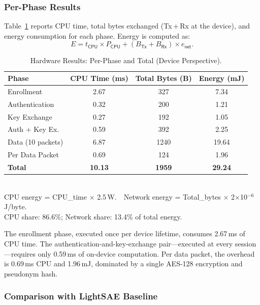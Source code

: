 \documentclass[conference]{IEEEtran}
\begin{document}
\subsubsection{Per-Phase Results}

Table~\ref{tab:hwresults} reports CPU time, total bytes exchanged
(Tx\,+\,Rx at the device), and energy consumption for each phase.
Energy is computed as:
\begin{equation}
  E = t_\mathsf{CPU} \times P_\mathsf{CPU}
      + (B_\mathsf{Tx}+B_\mathsf{Rx}) \times e_\mathsf{net}.
\end{equation}

\begin{table}[!t]
  \centering
  \caption{Hardware Results: Per-Phase and Total (Device Perspective).}
  \label{tab:hwresults}
  \scriptsize
  \setlength{\tabcolsep}{4pt}
  \begin{tabular}{lccc}
    \toprule
    Phase & CPU Time (ms) & Total Bytes (B) & Energy (mJ) \\
    \midrule
    Enrollment         & 2.67 & 327 & 7.34 \\
    Authentication     & 0.32 & 200 & 1.21 \\
    Key Exchange       & 0.27 & 192 & 1.05 \\
    Auth + Key Ex.     & 0.59 & 392 & 2.25 \\
    Data (10 packets)  & 6.87 & 1240 & 19.64 \\
    Per Data Packet    & 0.69 & 124  & 1.96 \\
    \midrule
    \textbf{Total}     & \textbf{10.13} & \textbf{1959} & \textbf{29.24} \\
    \bottomrule
  \end{tabular}\\[3pt]
  \scriptsize
  CPU energy = CPU\_time $\times$ 2.5\,W.\ \
  Network energy = Total\_bytes $\times$ 2$\times$10$^{-6}$\,J/byte.\\
  CPU share: 86.6\%; Network share: 13.4\% of total energy.
\end{table}

The enrollment phase, executed once per device lifetime, consumes 2.67\,ms
of CPU time.  The authentication-and-key-exchange pair—executed at every
session—requires only 0.59\,ms of on-device computation.  Per data packet,
the overhead is 0.69\,ms CPU and 1.96\,mJ, dominated by a single AES-128
encryption and pseudonym hash.

\subsubsection{Comparison with LightSAE Baseline}
\end{document}
